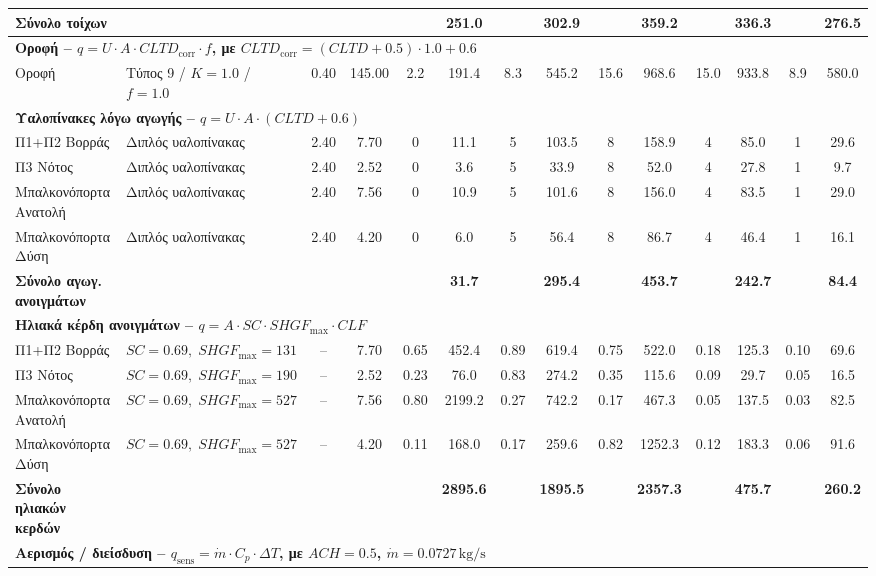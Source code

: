 \documentclass[12pt,a4paper]{article}
\begin{document}
\begin{landscape}
\begin{table}[H]
{\begin{tabular}{llcc*{5}{cc}}
\textbf{Σύνολο τοίχων} &  &  &  &  & \textbf{251.0} &  & \textbf{302.9} &  & \textbf{359.2} &  & \textbf{336.3} &  & \textbf{276.5} \\
\midrule
\multicolumn{14}{l}{\textbf{Οροφή -- \(q = U \cdot A \cdot CLTD_{\mathrm{corr}} \cdot f\), με \(CLTD_{\mathrm{corr}}=(CLTD+0.5)\cdot 1.0+0.6\)}} \\
Οροφή & Τύπος 9 / \(K=1.0\) / \(f=1.0\) & 0.40 & 145.00 & 2.2 & 191.4 & 8.3 & 545.2 & 15.6 & 968.6 & 15.0 & 933.8 & 8.9 & 580.0 \\
\midrule
\multicolumn{14}{l}{\textbf{Υαλοπίνακες λόγω αγωγής -- \(q = U \cdot A \cdot (CLTD+0.6)\)}} \\
Π1+Π2 Βορράς & Διπλός υαλοπίνακας & 2.40 & 7.70 & 0 & 11.1 & 5 & 103.5 & 8 & 158.9 & 4 & 85.0 & 1 & 29.6 \\
Π3 Νότος & Διπλός υαλοπίνακας & 2.40 & 2.52 & 0 & 3.6 & 5 & 33.9 & 8 & 52.0 & 4 & 27.8 & 1 & 9.7 \\
Μπαλκονόπορτα Ανατολή & Διπλός υαλοπίνακας & 2.40 & 7.56 & 0 & 10.9 & 5 & 101.6 & 8 & 156.0 & 4 & 83.5 & 1 & 29.0 \\
Μπαλκονόπορτα Δύση & Διπλός υαλοπίνακας & 2.40 & 4.20 & 0 & 6.0 & 5 & 56.4 & 8 & 86.7 & 4 & 46.4 & 1 & 16.1 \\
\textbf{Σύνολο αγωγ. ανοιγμάτων} &  &  &  &  & \textbf{31.7} &  & \textbf{295.4} &  & \textbf{453.7} &  & \textbf{242.7} &  & \textbf{84.4} \\
\midrule
\multicolumn{14}{l}{\textbf{Ηλιακά κέρδη ανοιγμάτων -- \(q = A \cdot SC \cdot SHGF_{\max} \cdot CLF\)}} \\
Π1+Π2 Βορράς & \(SC=0.69,\; SHGF_{\max}=131\) & -- & 7.70 & 0.65 & 452.4 & 0.89 & 619.4 & 0.75 & 522.0 & 0.18 & 125.3 & 0.10 & 69.6 \\
Π3 Νότος & \(SC=0.69,\; SHGF_{\max}=190\) & -- & 2.52 & 0.23 & 76.0 & 0.83 & 274.2 & 0.35 & 115.6 & 0.09 & 29.7 & 0.05 & 16.5 \\
Μπαλκονόπορτα Ανατολή & \(SC=0.69,\; SHGF_{\max}=527\) & -- & 7.56 & 0.80 & 2199.2 & 0.27 & 742.2 & 0.17 & 467.3 & 0.05 & 137.5 & 0.03 & 82.5 \\
Μπαλκονόπορτα Δύση & \(SC=0.69,\; SHGF_{\max}=527\) & -- & 4.20 & 0.11 & 168.0 & 0.17 & 259.6 & 0.82 & 1252.3 & 0.12 & 183.3 & 0.06 & 91.6 \\
\textbf{Σύνολο ηλιακών κερδών} &  &  &  &  & \textbf{2895.6} &  & \textbf{1895.5} &  & \textbf{2357.3} &  & \textbf{475.7} &  & \textbf{260.2} \\
\midrule
\multicolumn{14}{l}{\textbf{Αερισμός / διείσδυση -- \(q_{\mathrm{sens}} = \dot{m} \cdot C_p \cdot \Delta T\), με \(ACH=0.5\), \(\dot{m}=0.0727\,\mathrm{kg/s}\)}} \\

\end{tabular}}
\end{table}
\end{landscape}
\end{document}

